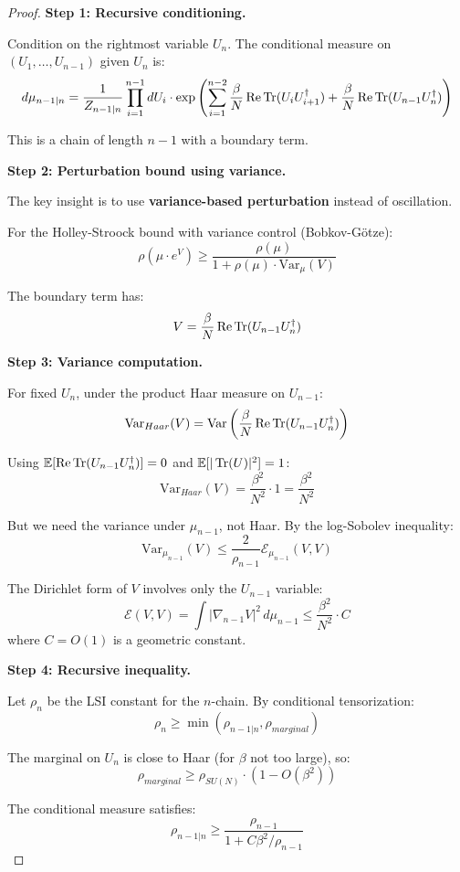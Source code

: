 \begin{proof}
\textbf{Step 1: Recursive conditioning.}

Condition on the rightmost variable $U_n$. The conditional measure on $(U_1, \ldots, U_{n-1})$ given $U_n$ is:
\[
d\mu_{n-1|n} = \frac{1}{Z_{n-1|n}} \prod_{i=1}^{n-1} dU_i \cdot \exp\left(\sum_{i=1}^{n-2} \frac{\beta}{N} \operatorname{Re}\operatorname{Tr}(U_i U_{i+1}^\dagger) + \frac{\beta}{N}\operatorname{Re}\operatorname{Tr}(U_{n-1} U_n^\dagger)\right)
\]

This is a chain of length $n-1$ with a boundary term.

\textbf{Step 2: Perturbation bound using variance.}

The key insight is to use \textbf{variance-based perturbation} instead of oscillation.

For the Holley-Stroock bound with variance control (Bobkov-Götze):
\[
\rho(\mu \cdot e^V) \geq \frac{\rho(\mu)}{1 + \rho(\mu) \cdot \mathrm{Var}_\mu(V)}
\]

The boundary term has:
\[
V = \frac{\beta}{N}\operatorname{Re}\operatorname{Tr}(U_{n-1} U_n^\dagger)
\]

\textbf{Step 3: Variance computation.}

For fixed $U_n$, under the product Haar measure on $U_{n-1}$:
\[
\mathrm{Var}_{Haar}(V) = \mathrm{Var}\left(\frac{\beta}{N}\operatorname{Re}\operatorname{Tr}(U_{n-1} U_n^\dagger)\right)
\]

Using $\mathbb{E}[\operatorname{Re}\operatorname{Tr}(U_{n-1} U_n^\dagger)] = 0$ and $\mathbb{E}[|\operatorname{Tr}(U)|^2] = 1$:
\[
\mathrm{Var}_{Haar}(V) = \frac{\beta^2}{N^2} \cdot 1 = \frac{\beta^2}{N^2}
\]

But we need the variance under $\mu_{n-1}$, not Haar. By the log-Sobolev inequality:
\[
\mathrm{Var}_{\mu_{n-1}}(V) \leq \frac{2}{\rho_{n-1}} \mathcal{E}_{\mu_{n-1}}(V, V)
\]

The Dirichlet form of $V$ involves only the $U_{n-1}$ variable:
\[
\mathcal{E}(V, V) = \int |\nabla_{n-1} V|^2 \, d\mu_{n-1} \leq \frac{\beta^2}{N^2} \cdot C
\]
where $C = O(1)$ is a geometric constant.

\textbf{Step 4: Recursive inequality.}

Let $\rho_n$ be the LSI constant for the $n$-chain. By conditional tensorization:
\[
\rho_n \geq \min\left(\rho_{n-1|n}, \rho_{marginal}\right)
\]

The marginal on $U_n$ is close to Haar (for $\beta$ not too large), so:
\[
\rho_{marginal} \geq \rho_{SU(N)} \cdot (1 - O(\beta^2))
\]

The conditional measure satisfies:
\[
\rho_{n-1|n} \geq \frac{\rho_{n-1}}{1 + C\beta^2/\rho_{n-1}}
\]


\end{proof}
